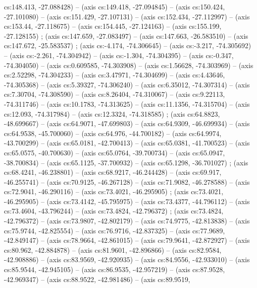   cs:148.413, -27.088428) -- (axis cs:149.418, -27.094845) -- (axis
  cs:150.424, -27.101080) -- (axis cs:151.429, -27.107131) -- (axis
  cs:152.434, -27.112997) -- (axis cs:153.44, -27.118675) -- (axis cs:154.445,
  -27.124163) -- (axis cs:155.199, -27.128155) ; 
  (axis cs:147.659, -27.083497) -- (axis cs:147.663, -26.583510) -- (axis
  cs:147.672, -25.583537) ;  (axis cs:-4.174,
  -74.306645) -- (axis cs:-3.217, -74.305692) -- (axis cs:-2.261, -74.304942)
  -- (axis cs:-1.304, -74.304395) -- (axis cs:-0.347, -74.304050) -- (axis
  cs:0.609585, -74.303908) -- (axis cs:1.56628, -74.303969) -- (axis
  cs:2.52298, -74.304233) -- (axis cs:3.47971, -74.304699) -- (axis
  cs:4.43646, -74.305368) -- (axis cs:5.39327, -74.306240) -- (axis
  cs:6.35012, -74.307314) -- (axis cs:7.30704, -74.308590) -- (axis
  cs:8.26404, -74.310067) -- (axis cs:9.22113, -74.311746) -- (axis
  cs:10.1783, -74.313625) -- (axis cs:11.1356, -74.315704) -- (axis cs:12.093,
  -74.317984) -- (axis cs:12.3324, -74.318585) ; 
  (axis cs:64.8823, -48.699667) -- (axis cs:64.9071, -47.699803) -- (axis
  cs:64.9309, -46.699934) -- (axis cs:64.9538, -45.700060) -- (axis cs:64.976,
  -44.700182) -- (axis cs:64.9974, -43.700299) -- (axis cs:65.0181,
  -42.700413) -- (axis cs:65.0381, -41.700523) -- (axis cs:65.0575,
  -40.700630) -- (axis cs:65.0764, -39.700734) -- (axis cs:65.0947,
  -38.700834) -- (axis cs:65.1125, -37.700932) -- (axis cs:65.1298,
  -36.701027) ;  (axis cs:68.4241, -46.238801) --
  (axis cs:68.9217, -46.244428) -- (axis cs:69.917, -46.255741) -- (axis
  cs:70.9125, -46.267128) -- (axis cs:71.9082, -46.278588) -- (axis
  cs:72.9041, -46.290116) -- (axis cs:73.4021, -46.295905)
  ;  (axis cs:73.4021, -46.295905) -- (axis
  cs:73.4142, -45.795975) -- (axis cs:73.4377, -44.796112) -- (axis
  cs:73.4604, -43.796244) -- (axis cs:73.4824, -42.796372)
  ;  (axis cs:73.4824, -42.796372) -- (axis
  cs:73.9807, -42.802179) -- (axis cs:74.9775, -42.813838) -- (axis
  cs:75.9744, -42.825554) -- (axis cs:76.9716, -42.837325) -- (axis
  cs:77.9689, -42.849147) -- (axis cs:78.9664, -42.861015) -- (axis
  cs:79.9641, -42.872927) -- (axis cs:80.962, -42.884878) -- (axis cs:81.9601,
  -42.896866) -- (axis cs:82.9584, -42.908886) -- (axis cs:83.9569,
  -42.920935) -- (axis cs:84.9556, -42.933010) -- (axis cs:85.9544,
  -42.945105) -- (axis cs:86.9535, -42.957219) -- (axis cs:87.9528,
  -42.969347) -- (axis cs:88.9522, -42.981486) -- (axis cs:89.9519,

